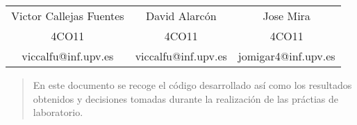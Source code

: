 \vfill
{
    \maketitle
    \vspace{1cm}
    \begin{center}
    \begin{tabular}{c c c}
        Victor Callejas Fuentes &  David Alarcón & Jose Mira\\
        \small 4CO11 & 4CO11 & 4CO11 \\
        \small viccalfu@inf.upv.es & viccalfu@inf.upv.es & jomigar4@inf.upv.es \\
    \end{tabular}
    \end{center}
    \vspace{1cm}
    \begin{abstract}
        \center En este documento se recoge el código desarrollado así como los resultados obtenidos y decisiones tomadas durante la realización de las práctias de laboratorio.
    \end{abstract}

    \newpage
}
